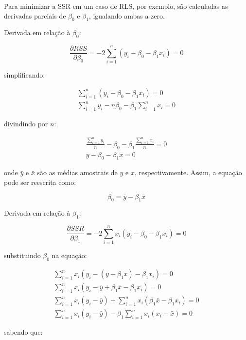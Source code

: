 Para minimizar a SSR em um caso de RLS, por exemplo, são calculadas as derivadas parciais de $\beta_0$ e $\beta_1$, igualando ambas a zero.

Derivada em relação à $\beta_0$:

\begin{equation}
	\frac{\partial RSS}{\partial \beta_0} = -2 \sum_{i=1}^n (y_i - \beta_0 - \beta_1 x_i) = 0
\end{equation}

simplificando:

\begin{gather*}
	\sum_{i=1}^n (y_i - \beta_0 - \beta_1 x_i) = 0 \\
	\sum_{i=1}^n y_i - n \beta_0 - \beta_1 \sum_{i=1}^n x_i = 0
\end{gather*}

divindindo por $n$:

\begin{gather*}
	\frac{\sum_{i=1}^n y_i}{n} - \beta_0 - \beta_1 \frac{\sum_{i=1}^n x_i}{n} = 0 \\
	\bar{y} - \beta_0 - \beta_1 \bar{x} = 0
\end{gather*}

onde $\bar{y}$ e $\bar{x}$ são as médias amostrais de $y$ e $x$, respectivamente. Assim, a equação pode ser reescrita como:

\begin{equation}
	\beta_0 = \bar{y} - \beta_1 \bar{x}
	\label{eq:beta0}
\end{equation}

Derivada em relação à $\beta_1$:

\begin{equation}
	\frac{\partial SSR}{\partial \beta_1} = -2 \sum_{i=1}^n x_i (y_i - \beta_0 - \beta_1 x_i) = 0
\end{equation}

substituindo $\beta_0$ na equação:


\begin{gather*}
	\sum_{i=1}^n x_i (y_i - (\bar{y} - \beta_1 \bar{x}) - \beta_1 x_i) = 0 \\
	\sum_{i=1}^n x_i (y_i - \bar{y} + \beta_1 \bar{x} - \beta_1 x_i) = 0 \\
	\sum_{i=1}^n x_i (y_i - \bar{y}) + \sum_{i=1}^n x_i (\beta_1 \bar{x} - \beta_1 x_i) = 0 \\
	\sum_{i=1}^n x_i (y_i - \bar{y}) - \beta_1 \sum_{i=1}^n x_i (x_i - \bar{x}) = 0
\end{gather*}

sabendo que:

